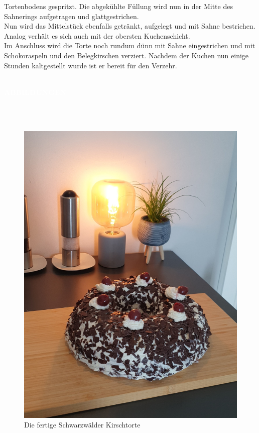 \documentclass[a4paper, 12 pt]{article}
\newcommand{\coloredSection}[1]{{\small \colorbox{DeepSkyBlue1}{\begin{minipage}{0.99\textwidth}{\textbf{#1 \vphantom{p\^{E}}}}\end{minipage}}}}
\begin{document}
Tortenbodens gespritzt. Die abgekühlte Füllung wird nun in der Mitte des Sahnerings aufgetragen und glattgestrichen. \\
Nun wird das Mittelstück ebenfalls getränkt, aufgelegt und mit Sahne bestrichen. Analog verhält es sich auch mit der obersten Kuchenschicht. \\
Im Anschluss wird die Torte noch rundum dünn mit Sahne eingestrichen und mit Schokoraspeln und den Belegkirschen verziert. 
Nachdem der Kuchen nun einige Stunden kaltgestellt wurde ist er bereit für den Verzehr. \\\\
\noindent
\coloredSection{\textbf{\textcolor{white}{ABBILDUNGEN}}}\\[-0.3cm]\\
\begin{figure}[h!]
    \includegraphics[width=1\linewidth]{FertigerKuchen.jpg}
    \caption{Die fertige Schwarzwälder Kirschtorte}
    \label{fig:cake}
  \end{figure}
\end{document}
